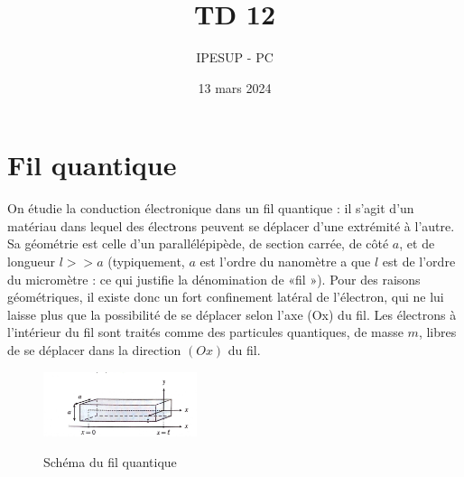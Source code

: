 \documentclass{article}
\title{TD 12 }
\author{IPESUP - PC }
\date{13 mars 2024}
\begin{document}
\maketitle



\section{Fil quantique}

On étudie la conduction électronique dans un fil quantique : il s’agit d’un matériau dans lequel
des électrons peuvent se déplacer d’une extrémité à l’autre. Sa géométrie est celle d'un parallélépipède, de section carrée, de côté $a$, et de longueur $l>>a$ (typiquement, $a$ est l’ordre du
nanomètre a que $l$ est de l’ordre du micromètre : ce qui justifie la dénomination de «fil »).
Pour des raisons géométriques, il existe donc un fort confinement latéral de l’électron, qui ne
lui laisse plus que la possibilité de se déplacer selon l’axe (Ox) du fil. Les
électrons à l’intérieur du fil sont traités comme des particules quantiques, de masse $m$, libres
de se déplacer dans la direction $(Ox)$ du fil.

\begin{figure}[h]
  \centering
  \includegraphics[width=0.4\textwidth]{schéma.png}
  \label{fig:monlabel}
    \caption{Schéma du fil quantique}
\end{figure}
\end{document}
